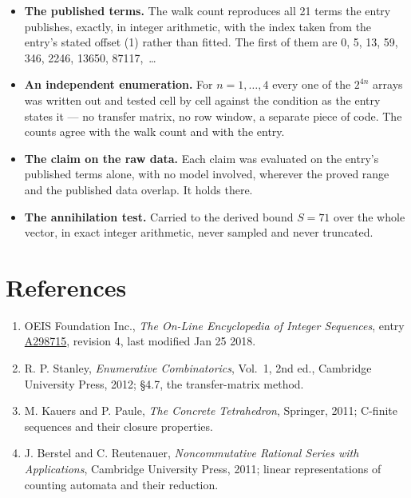 \documentclass[11pt]{article}
\theoremstyle{definition}
\begin{document}
\begin{itemize}

\item {\bfseries The published terms.} The walk count reproduces all 21 terms the entry publishes, exactly, in integer arithmetic, with the index taken from the entry's stated offset (1) rather than fitted. The first of them are 0, 5, 13, 59, 346, 2246, 13650, 87117,~\dots

\item {\bfseries An independent enumeration.} For $n = 1,\dots,4$ every one of the $2^{4n}$ arrays was written out and tested cell by cell against the condition as the entry states it --- no transfer matrix, no row window, a separate piece of code. The counts agree with the walk count and with the entry.

\item {\bfseries The claim on the raw data.} Each claim was evaluated on the entry's published terms alone, with no model involved, wherever the proved range and the published data overlap. It holds there.

\item {\bfseries The annihilation test.} Carried to the derived bound $S = 71$ over the whole vector, in exact integer arithmetic, never sampled and never truncated.

\end{itemize}

\section{References}

\begin{enumerate}

\item OEIS Foundation Inc., \emph{The On-Line Encyclopedia of Integer Sequences}, entry \href{https://oeis.org/A298715}{A298715}, revision 4, last modified Jan 25 2018.

\item R. P. Stanley, \emph{Enumerative Combinatorics}, Vol.~1, 2nd ed., Cambridge University Press, 2012; \S4.7, the transfer-matrix method.

\item M. Kauers and P. Paule, \emph{The Concrete Tetrahedron}, Springer, 2011; C-finite sequences and their closure properties.

\item J. Berstel and C. Reutenauer, \emph{Noncommutative Rational Series with Applications}, Cambridge University Press, 2011; linear representations of counting automata and their reduction.

\end{enumerate}
\end{document}
